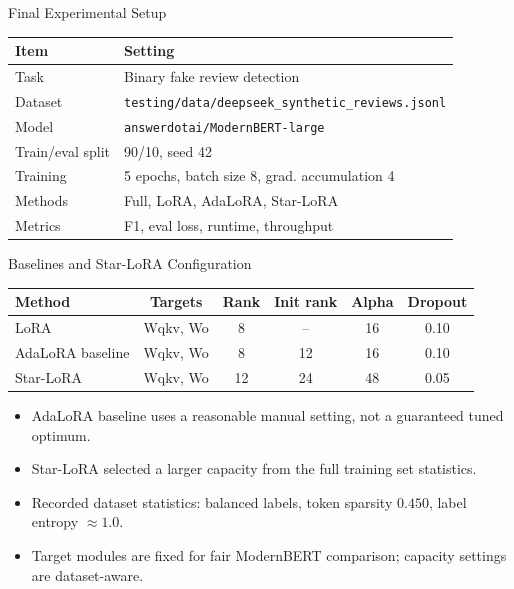 \begin{frame}{Final Experimental Setup}
\begin{table}
\centering
\small
\begin{tabular}{ll}
\toprule
Item & Setting \\
\midrule
Task & Binary fake review detection \\
Dataset & \texttt{testing/data/deepseek\_synthetic\_reviews.jsonl} \\
Model & \texttt{answerdotai/ModernBERT-large} \\
Train/eval split & 90/10, seed 42 \\
Training & 5 epochs, batch size 8, grad. accumulation 4 \\
Methods & Full, LoRA, AdaLoRA, Star-LoRA \\
Metrics & F1, eval loss, runtime, throughput \\
\bottomrule
\end{tabular}
\end{table}
\end{frame}

\begin{frame}{Baselines and Star-LoRA Configuration}
\begin{table}
\centering
\scriptsize
\begin{tabular}{lccccc}
\toprule
Method & Targets & Rank & Init rank & Alpha & Dropout \\
\midrule
LoRA & Wqkv, Wo & 8 & -- & 16 & 0.10 \\
AdaLoRA baseline & Wqkv, Wo & 8 & 12 & 16 & 0.10 \\
Star-LoRA & Wqkv, Wo & 12 & 24 & 48 & 0.05 \\
\bottomrule
\end{tabular}
\end{table}

\vspace{6pt}
\begin{itemize}
  \item AdaLoRA baseline uses a reasonable manual setting, not a guaranteed tuned optimum.
  \item Star-LoRA selected a larger capacity from the full training set statistics.
  \item Recorded dataset statistics: balanced labels, token sparsity \(0.450\), label entropy \(\approx 1.0\).
  \item Target modules are fixed for fair ModernBERT comparison; capacity settings are dataset-aware.
\end{itemize}
\end{frame}

